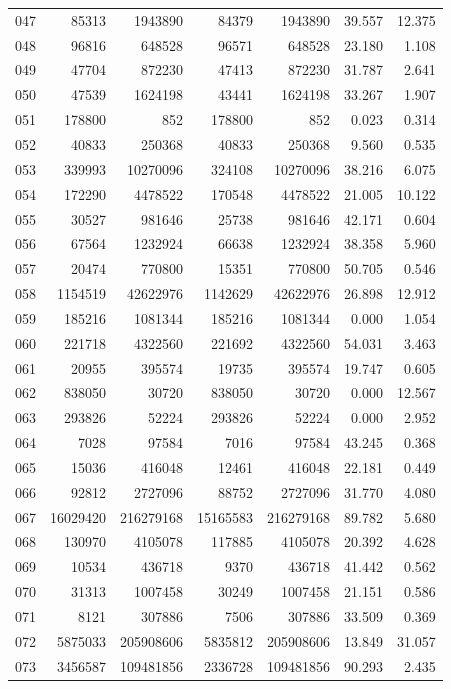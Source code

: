 \begin{longtable}{lrrrrrr}
047 & 85313 & 1943890 & 84379 & 1943890 & 39.557 & 12.375\\
048 & 96816 & 648528 & 96571 & 648528 & 23.180 & 1.108\\
049 & 47704 & 872230 & 47413 & 872230 & 31.787 & 2.641\\
050 & 47539 & 1624198 & 43441 & 1624198 & 33.267 & 1.907\\
051 & 178800 & 852 & 178800 & 852 & 0.023 & 0.314\\
052 & 40833 & 250368 & 40833 & 250368 & 9.560 & 0.535\\
053 & 339993 & 10270096 & 324108 & 10270096 & 38.216 & 6.075\\
054 & 172290 & 4478522 & 170548 & 4478522 & 21.005 & 10.122\\
055 & 30527 & 981646 & 25738 & 981646 & 42.171 & 0.604\\
056 & 67564 & 1232924 & 66638 & 1232924 & 38.358 & 5.960\\
057 & 20474 & 770800 & 15351 & 770800 & 50.705 & 0.546\\
058 & 1154519 & 42622976 & 1142629 & 42622976 & 26.898 & 12.912\\
059 & 185216 & 1081344 & 185216 & 1081344 & 0.000 & 1.054\\
060 & 221718 & 4322560 & 221692 & 4322560 & 54.031 & 3.463\\
061 & 20955 & 395574 & 19735 & 395574 & 19.747 & 0.605\\
062 & 838050 & 30720 & 838050 & 30720 & 0.000 & 12.567\\
063 & 293826 & 52224 & 293826 & 52224 & 0.000 & 2.952\\
064 & 7028 & 97584 & 7016 & 97584 & 43.245 & 0.368\\
065 & 15036 & 416048 & 12461 & 416048 & 22.181 & 0.449\\
066 & 92812 & 2727096 & 88752 & 2727096 & 31.770 & 4.080\\
067 & 16029420 & 216279168 & 15165583 & 216279168 & 89.782 & 5.680\\
068 & 130970 & 4105078 & 117885 & 4105078 & 20.392 & 4.628\\
069 & 10534 & 436718 & 9370 & 436718 & 41.442 & 0.562\\
070 & 31313 & 1007458 & 30249 & 1007458 & 21.151 & 0.586\\
071 & 8121 & 307886 & 7506 & 307886 & 33.509 & 0.369\\
072 & 5875033 & 205908606 & 5835812 & 205908606 & 13.849 & 31.057\\
073 & 3456587 & 109481856 & 2336728 & 109481856 & 90.293 & 2.435\\

\end{longtable}
